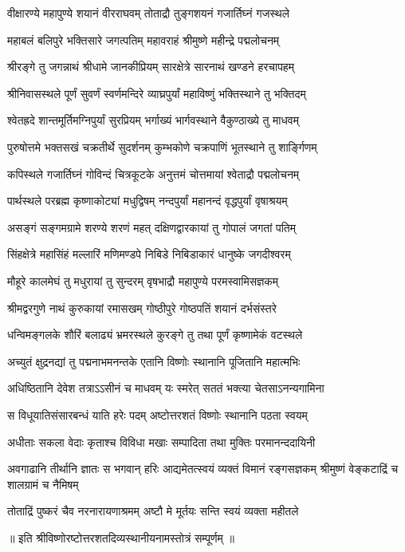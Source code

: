 \twolineshloka
{वीक्षारण्ये महापुण्ये शयानं वीरराघवम्}
{तोताद्रौ तुङ्गशयनं गजार्तिघ्नं गजस्थले}

\twolineshloka
{महाबलं बलिपुरे भक्तिसारे जगत्पतिम्}
{महावराहं श्रीमुष्णे महीन्द्रे पद्मलोचनम्}

\twolineshloka
{श्रीरङ्गे तु जगन्नाथं श्रीधामे जानकीप्रियम्}
{सारक्षेत्रे सारनाथं खण्डने हरचापहम्}

\twolineshloka
{श्रीनिवासस्थले पूर्णं सुवर्णं स्वर्णमन्दिरे}
{व्याघ्रपुर्यां महाविष्णुं भक्तिस्थाने तु भक्तिदम्}

\twolineshloka
{श्वेतह्रदे शान्तमूर्तिमग्निपुर्यां सुरप्रियम्}
{भर्गाख्यं भार्गवस्थाने वैकुण्ठाख्ये तु माधवम्}

\twolineshloka
{पुरुषोत्तमे भक्तसखं चक्रतीर्थे सुदर्शनम्}
{कुम्भकोणे चक्रपाणिं भूतस्थाने तु शार्ङ्गिणम्}

\twolineshloka
{कपिस्थले गजार्तिघ्नं गोविन्दं चित्रकूटके}
{अनुत्तमं चोत्तमायां श्वेताद्रौ पद्मलोचनम्}

\twolineshloka
{पार्थस्थले परब्रह्म कृष्णाकोट्यां मधुद्विषम्}
{नन्दपुर्यां महानन्दं वृद्धपुर्यां वृषाश्रयम्}

\twolineshloka
{असङ्गं सङ्गमग्रामे शरण्ये शरणं महत्}
{दक्षिणद्वारकायां तु गोपालं जगतां पतिम्}

\twolineshloka
{सिंहक्षेत्रे महासिंहं मल्लारिं मणिमण्डपे}
{निबिडे निबिडाकारं धानुष्के जगदीश्वरम्}

\twolineshloka
{मौहूरे कालमेघं तु मधुरायां तु सुन्दरम्}
{वृषभाद्रौ महापुण्ये परमस्वामिसज्ञकम्}

\twolineshloka
{श्रीमद्वरगुणे नाथं कुरुकायां रमासखम्}
{गोष्ठीपुरे गोष्ठपतिं शयानं दर्भसंस्तरे}

\twolineshloka
{धन्विमङ्गलके शौरिं बलाढ्यं भ्रमरस्थले}
{कुरङ्गे तु तथा पूर्णं कृष्णामेकं वटस्थले}

\twolineshloka
{अच्युतं क्षुद्रनद्यां तु पद्मनाभमनन्तके}
{एतानि विष्णोः स्थानानि पूजितानि महात्मभिः}

\twolineshloka
{अधिष्ठितानि देवेश तत्राऽऽसीनं च माधवम्}
{यः स्मरेत् सततं भक्त्या चेतसाऽनन्यगामिना}

\twolineshloka
{स विधूयातिसंसारबन्धं याति हरेः पदम्}
{अष्टोत्तरशतं विष्णोः स्थानानि पठता स्वयम्}

\twolineshloka
{अधीताः सकला वेदाः कृताश्च विविधा मखाः}
{सम्पादिता तथा मुक्तिः परमानन्ददायिनी}

\threelineshloka
{अवगाढानि तीर्थानि ज्ञातः स भगवान् हरिः}
{आद्यमेतत्स्वयं व्यक्तं विमानं रङ्गसज्ञकम्}
{श्रीमुष्णं वेङ्कटाद्रिं च शालग्रामं च नैमिषम्}

\twolineshloka
{तोताद्रिं पुष्करं चैव नरनारायणाश्रमम्}
{अष्टौ मे मूर्तयः सन्ति स्वयं व्यक्ता महीतले}

{॥ इति श्रीविष्णोरष्टोत्तरशतदिव्यस्थानीयनामस्तोत्रं सम्पूर्णम् ॥}
